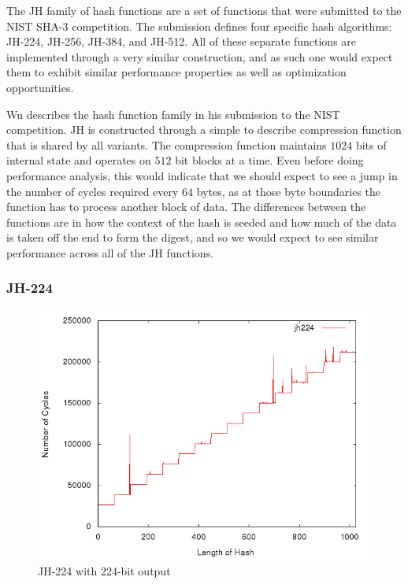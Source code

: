 The JH family of hash functions are a set of functions that were submitted to
the NIST SHA-3 competition. The submission defines four specific hash
algorithms: JH-224, JH-256, JH-384, and JH-512. All of these separate functions
are implemented through a very similar construction, and as such one would
expect them to exhibit similar performance properties as well as optimization
opportunities.

Wu\cite{wu2008jh} describes the hash function family in his submission to the
NIST competition. JH is constructed through a simple to describe compression
function that is shared by all variants. The compression function maintains
$1024$ bits of internal state and operates on $512$ bit blocks at a time. Even
before doing performance analysis, this would indicate that we should expect to
see a jump in the number of cycles required every $64$ bytes, as at those byte
boundaries the function has to process another block of data. The differences
between the functions are in how the context of the hash is seeded and how much
of the data is taken off the end to form the digest, and so we would expect to
see similar performance across all of the JH functions.

\subsubsection{JH-224}
\begin{figure}[H]
    \begin{center}
        \includegraphics[scale=0.5]{images/jh224.png} 
        \caption{JH-224 with 224-bit output}
    \end{center}
\end{figure}

